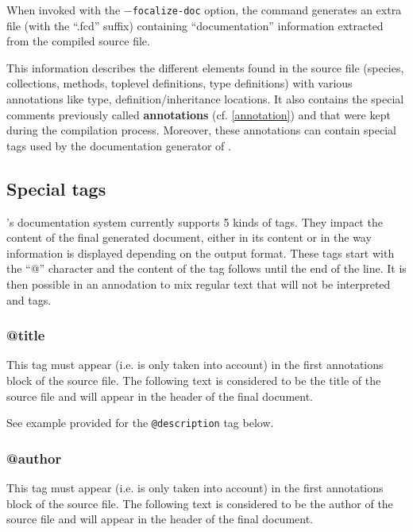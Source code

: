 \label{documentation-generation}
When invoked with the {\tt $-$focalize-doc} option, the command
{\focalizec} generates an extra file (with the ``.fcd'' suffix)
containing ``documentation'' information extracted from the compiled
source file.

This information describes the different elements found in the source
file (species, collections, methods, toplevel definitions, type
definitions) with various annotations like type,
definition/inheritance locations. It also contains the special comments
previously called {\bf annotations} (cf. \ref{annotation}) and that
were kept during the compilation process. Moreover, these annotations
can contain special tags used by the documentation generator of
{\focal}.



\subsection{Special tags}
{\focal}'s documentation system currently supports 5 kinds of
tags. They impact the content of the final generated document,
either in its content or in the way information is displayed depending
on the output format. These tags start with the ``@'' character and
the content of the tag follows until the end of the line. It is then
possible in an annodation to mix regular text that will not be
interpreted and tags.

\subsubsection{@title}
This tag must appear (i.e. is only taken into account) in the first
annotations block of the source file. The following text is considered
to be the title of the source file and will appear in the header of
the final document.

See example provided for the {\tt @description} tag below.



\subsubsection{@author}
This tag must appear (i.e. is only taken into account) in the first
annotations block of the source file. The following text is considered
to be the author of the source file and will appear in the header of
the final document.

